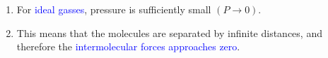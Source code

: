 \documentclass[10pt,compress]{beamer}
\begin{document}
\begin{frame}
\begin{columns}
\begin{column}[l]{0.5\linewidth}
\begin{enumerate}
       \item<6->For \textcolor{blue}{ideal gasses}, pressure is sufficiently small $\left(P\rightarrow 0\right)$. 
       \item<6-> This means that the molecules are separated by infinite distances, and therefore the \textcolor{blue}{intermolecular forces approaches zero}. 
     \end{enumerate}
    \end{column}
  \end{columns}

\end{frame}
\normalsize
\end{document}
